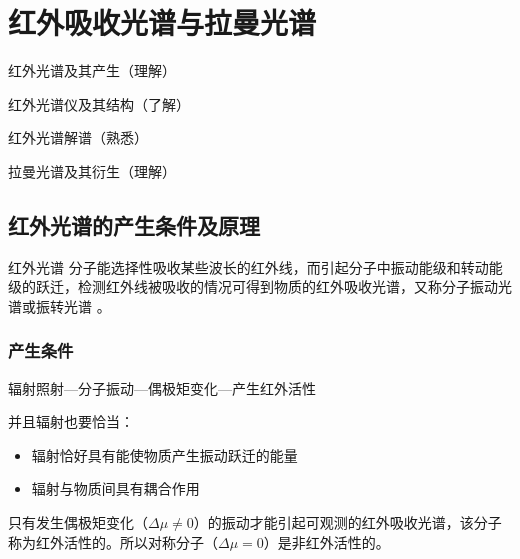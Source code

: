 \chapter{红外吸收光谱与拉曼光谱}
\begin{introduction}
    \item 红外光谱及其产生（理解）
    \item 红外光谱仪及其结构（了解）
    \item 红外光谱解谱（熟悉）
    \item 拉曼光谱及其衍生（理解）
\end{introduction}
\section{红外光谱的产生条件及原理}
\begin{definition*}{红外光谱}
    分子能选择性吸收某些波长的红外线，而引起分子中振动能级和转动能级的跃迁，检测红外线被吸收的情况可得到物质的红外吸收光谱，又称分子振动光谱或振转光谱 。
\end{definition*}
\subsection{产生条件}
辐射照射---分子振动---偶极矩变化---产生红外活性

并且辐射也要恰当：
\begin{itemize}
    \item 辐射恰好具有能使物质产生振动跃迁的能量
    \item 辐射与物质间具有耦合作用
\end{itemize}
\begin{note}
    只有发生偶极矩变化（$\Delta \mu \neq 0$）的振动才能引起可观测的红外吸收光谱，该分子称为红外活性的。所以对称分子（$\Delta \mu=0$）是非红外活性的。
\end{note}
